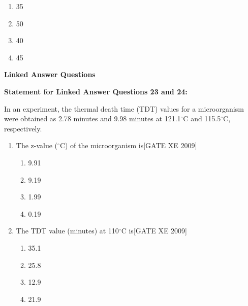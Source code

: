 \documentclass[journal,12pt,onecolumn]{IEEEtran}
\theoremstyle{remark}
\begin{document}
\begin{enumerate}
\begin{enumerate}
\begin{enumerate}[start=21, label=\textbf{Q.\arabic*.}, wide=0pt, leftmargin=*]
\begin{multicols}{2}
\begin{enumerate}
\item 35
\item 50
\item 40
\item 45
\end{enumerate}
\end{multicols}

\end{enumerate}

\vspace{1em}
\noindent\textbf{Linked Answer Questions}

\noindent\textbf{Statement for Linked Answer Questions 23 and 24:}

\vspace{0.5em}
In an experiment, the thermal death time (TDT) values for a microorganism were obtained as 2.78 minutes and 9.98 minutes at 121.1$^\circ$C and 115.5$^\circ$C, respectively.

\begin{enumerate}[start=23, label=\textbf{Q.\arabic*.}, wide=0pt, leftmargin=*]

\item The z-value ($^\circ$C) of the microorganism is\hfill[GATE XE 2009]

\begin{multicols}{2}
\begin{enumerate}
\item 9.91
\item 9.19
\item 1.99
\item 0.19
\end{enumerate}
\end{multicols}

\item The TDT value (minutes) at 110$^\circ$C is\hfill[GATE XE 2009]

\begin{multicols}{2}
\begin{enumerate}
\item 35.1
\item 25.8
\item 12.9
\item 21.9
\end{enumerate}
\end{multicols}

\end{enumerate}


\end{enumerate}
\end{enumerate}
    
\end{document}
